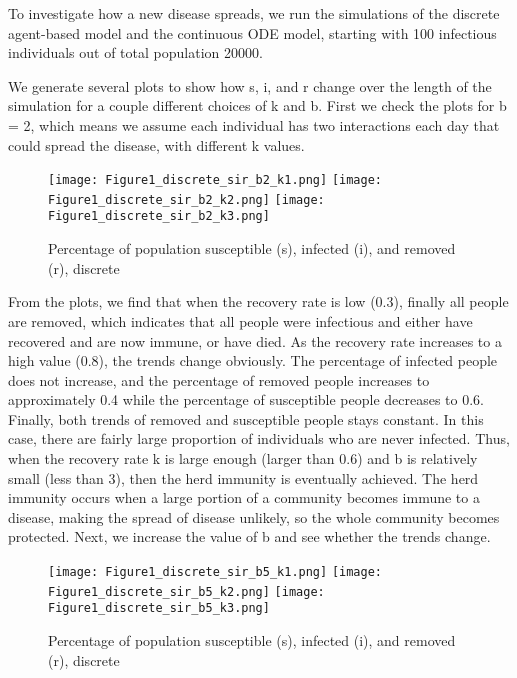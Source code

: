 \documentclass{article}
\begin{document}
To investigate how a new disease spreads, we run the simulations of the discrete agent-based model and the continuous ODE model, starting with 100 infectious individuals out of total population 20000. 

We generate several plots to show how s, i, and r change over the length of the simulation for a couple different choices of k and b. First we check the plots for b = 2, which means we assume each individual has two interactions each day that could spread the disease, with different k values. 

\begin{figure}[htp]

\centering
\texttt{[image: Figure1\_discrete\_sir\_b2\_k1.png]}\hfill
\texttt{[image: Figure1\_discrete\_sir\_b2\_k2.png]}\hfill
\texttt{[image: Figure1\_discrete\_sir\_b2\_k3.png]}

\caption{Percentage of population susceptible (s), infected (i), and removed (r), discrete}
\label{fig:figure3}

\end{figure}



From the plots, we find that when the recovery rate is low (0.3), finally all people are removed, which indicates that all people were infectious and either have recovered and are now immune, or have died. As the recovery rate increases to a high value (0.8), the trends change obviously. The percentage of infected people does not increase, and the percentage of removed people increases to approximately 0.4 while the percentage of susceptible people decreases to 0.6. Finally, both trends of removed and susceptible people stays constant. In this case, there are fairly large proportion of individuals who are never infected. Thus, when the recovery rate k is large enough (larger than 0.6) and b is relatively small (less than 3), then the herd immunity is eventually achieved. The herd immunity occurs when a large portion of a community becomes immune to a disease, making the spread of disease unlikely, so the whole community becomes protected. Next, we increase the value of b and see whether the trends change. 


\begin{figure}[htp]

\centering
\texttt{[image: Figure1\_discrete\_sir\_b5\_k1.png]}\hfill
\texttt{[image: Figure1\_discrete\_sir\_b5\_k2.png]}\hfill
\texttt{[image: Figure1\_discrete\_sir\_b5\_k3.png]}

\caption{Percentage of population susceptible (s), infected (i), and removed (r), discrete}
\label{fig:figure3}

\end{figure}
\end{document}
